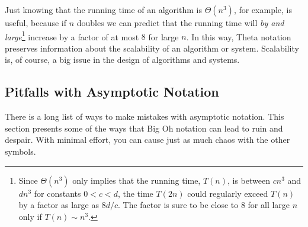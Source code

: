 Just knowing that the running time of an algorithm is $\Theta(n^3)$,
for example, is useful, because if $n$ doubles we can predict that the
running time will \emph{by and large}\footnote{Since $\Theta(n^3)$
  only implies that the running time, $T(n)$, is between $cn^3$ and
  $dn^3$ for constants $0<c<d$, the time $T(2n)$ could regularly
  exceed $T(n)$ by a factor as large as $8d/c$.  The factor is sure to
  be close to 8 for all large $n$ only if $T(n) \sim n^3$.} increase
by a factor of at most $8$ for large $n$.  In this way, Theta notation
preserves information about the scalability of an algorithm or system.
Scalability is, of course, a big issue in the design of algorithms and
systems.


\subsection{Pitfalls with Asymptotic Notation}

There is a long list of ways to make mistakes with asymptotic
notation.  This section presents some of the ways that Big Oh notation
can lead to ruin and despair.  With minimal effort, you can cause just
as much chaos with the other symbols.

